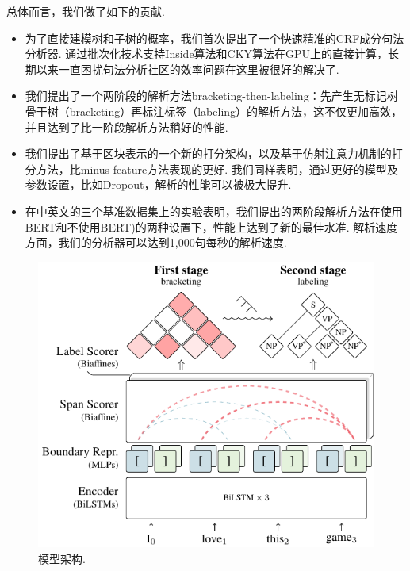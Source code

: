 总体而言，我们做了如下的贡献.
\begin{itemize}
    \item 为了直接建模树和子树的概率，我们首次提出了一个快速精准的CRF成分句法分析器.
          通过批次化技术支持Inside算法和CKY算法在GPU上的直接计算，长期以来一直困扰句法分析社区的效率问题在这里被很好的解决了.

    \item 我们提出了一个两阶段的解析方法bracketing-then-labeling：先产生无标记树骨干树（bracketing）再标注标签（labeling）的解析方法，这不仅更加高效，并且达到了比一阶段解析方法稍好的性能.

    \item 我们提出了基于区块表示的一个新的打分架构，以及基于仿射注意力机制的打分方法，比minus-feature方法表现的更好.
          我们同样表明，通过更好的模型及参数设置，比如Dropout，解析的性能可以被极大提升.

    \item 在中英文的三个基准数据集上的实验表明，我们提出的两阶段解析方法在使用BERT和不使用BERT\cite{devlin-etal-2019-bert})的两种设置下，性能上达到了新的最佳水准.
          解析速度方面，我们的分析器可以达到1,000句每秒的解析速度.
\end{itemize}

\begin{figure}[tb]
    \centering
    \includegraphics [scale=1.2]{figures/con-framework.pdf}
    \caption{模型架构.}
    \label{fig:con-framework}
\end{figure}

